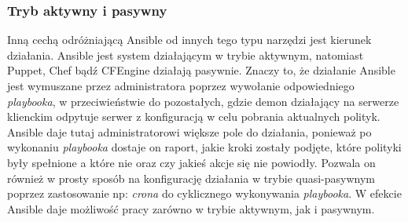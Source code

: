 \subsubsection{Tryb aktywny i pasywny}
Inną cechą odróżniającą Ansible od innych tego typu narzędzi jest kierunek działania.
Ansible jest system działającym w trybie aktywnym, natomiast Puppet, Chef bądź CFEngine działają pasywnie.
Znaczy to, że działanie Ansible jest wymuszane przez administratora poprzez wywołanie odpowiedniego \textit{playbooka}, w przeciwieństwie do pozostałych, gdzie demon działający na serwerze klienckim odpytuje serwer z konfiguracją w celu pobrania aktualnych polityk.
Ansible daje tutaj administratorowi większe pole do działania, ponieważ po wykonaniu \textit{playbooka} dostaje on raport, jakie kroki zostały podjęte, które polityki były spełnione a które nie oraz czy jakieś akcje się nie powiodły.
Pozwala on również w prosty sposób na konfigurację działania w trybie quasi-pasywnym poprzez zastosowanie np: \textit{crona} do cyklicznego wykonywania \textit{playbooka}.
W efekcie Ansible daje możliwość pracy zarówno w trybie aktywnym, jak i pasywnym.
